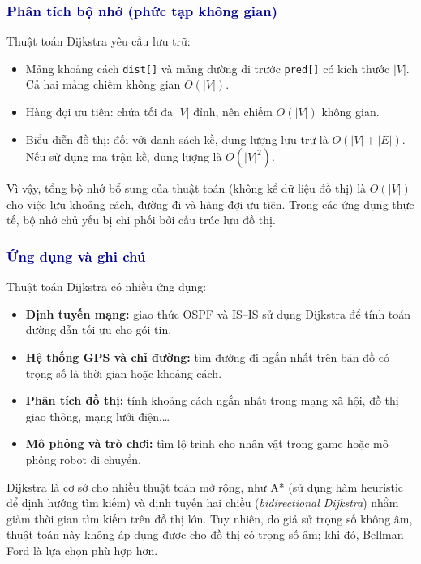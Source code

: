 \documentclass[14pt,a4paper]{report}
\begin{document}
\subsubsection{\textcolor{darkblue}{Phân tích bộ nhớ (phức tạp không gian)}}
Thuật toán Dijkstra yêu cầu lưu trữ:
\begin{itemize}
    \item Mảng khoảng cách \texttt{dist[]} và mảng đường đi trước \texttt{pred[]} có kích thước $|V|$. Cả hai mảng chiếm không gian $O(|V|)$.
    \item Hàng đợi ưu tiên: chứa tối đa $|V|$ đỉnh, nên chiếm $O(|V|)$ không gian.
    \item Biểu diễn đồ thị: đối với danh sách kề, dung lượng lưu trữ là $O(|V|+|E|)$. Nếu sử dụng ma trận kề, dung lượng là $O(|V|^2)$.
\end{itemize}

Vì vậy, tổng bộ nhớ bổ sung của thuật toán (không kể dữ liệu đồ thị) là $O(|V|)$ cho việc lưu khoảng cách, đường đi và hàng đợi ưu tiên. Trong các ứng dụng thực tế, bộ nhớ chủ yếu bị chi phối bởi cấu trúc lưu đồ thị.

\subsubsection{\textcolor{darkblue}{Ứng dụng và ghi chú}}
Thuật toán Dijkstra có nhiều ứng dụng:
\begin{itemize}
    \item \textbf{Định tuyến mạng:} giao thức OSPF và IS--IS sử dụng Dijkstra để tính toán đường dẫn tối ưu cho gói tin.
    \item \textbf{Hệ thống GPS và chỉ đường:} tìm đường đi ngắn nhất trên bản đồ có trọng số là thời gian hoặc khoảng cách.
    \item \textbf{Phân tích đồ thị:} tính khoảng cách ngắn nhất trong mạng xã hội, đồ thị giao thông, mạng lưới điện,\ldots
    \item \textbf{Mô phỏng và trò chơi:} tìm lộ trình cho nhân vật trong game hoặc mô phỏng robot di chuyển.
\end{itemize}

Dijkstra là cơ sở cho nhiều thuật toán mở rộng, như A* (sử dụng hàm heuristic để định hướng tìm kiếm) và định tuyến hai chiều (\textit{bidirectional Dijkstra}) nhằm giảm thời gian tìm kiếm trên đồ thị lớn. Tuy nhiên, do giả sử trọng số không âm, thuật toán này không áp dụng được cho đồ thị có trọng số âm; khi đó, Bellman--Ford là lựa chọn phù hợp hơn.
\end{document}
